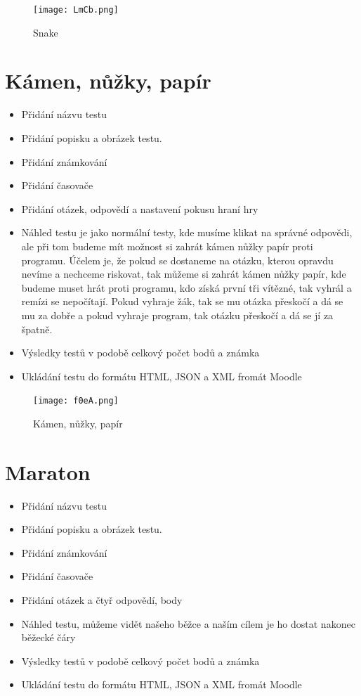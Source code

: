 \documentclass[12pt, a4paper, twoside, openright]{report}
\begin{document}
    \begin{figure}[h]
		\centering
		\texttt{[image: LmCb.png]}
		\caption{Snake}
		\label{fig:architecture}
	\end{figure}

    \section{Kámen, nůžky, papír}

\begin{itemize}
		\item Přidání názvu testu
		\item Přidání popisku a obrázek testu.
		\item Přidání známkování
		\item Přidání časovače
            \item Přidání otázek, odpovědí a nastavení pokusu hraní hry
            \item Náhled testu je jako normální testy, kde musíme klikat na správné odpovědi, ale při tom budeme mít možnost si zahrát kámen nůžky papír proti programu. Účelem je, že pokud se dostaneme na otázku, kterou opravdu nevíme a nechceme riskovat, tak můžeme si zahrát kámen nůžky papír, kde budeme muset hrát proti programu, kdo získá první tři vítězné, tak vyhrál a remízi se nepočítají. Pokud vyhraje žák, tak se mu otázka přeskočí a dá se mu za dobře a pokud vyhraje program, tak otázku přeskočí a dá se jí za špatně.
            \item Výsledky testů v podobě celkový počet bodů a známka
            \item Ukládání testu do formátu HTML, JSON a XML fromát Moodle
	\end{itemize}

    \begin{figure}[h]
		\centering
		\texttt{[image: f0eA.png]}
		\caption{Kámen, nůžky, papír}
		\label{fig:architecture}
	\end{figure}

        \section{Maraton}

\begin{itemize}
		\item Přidání názvu testu
		\item Přidání popisku a obrázek testu.
		\item Přidání známkování
		\item Přidání časovače
            \item Přidání otázek a čtyř odpovědí, body
            \item Náhled testu, můžeme vidět našeho běžce a naším cílem je ho dostat nakonec běžecké čáry
            \item Výsledky testů v podobě celkový počet bodů a známka
            \item Ukládání testu do formátu HTML, JSON a XML fromát Moodle
	\end{itemize}
\end{document}
